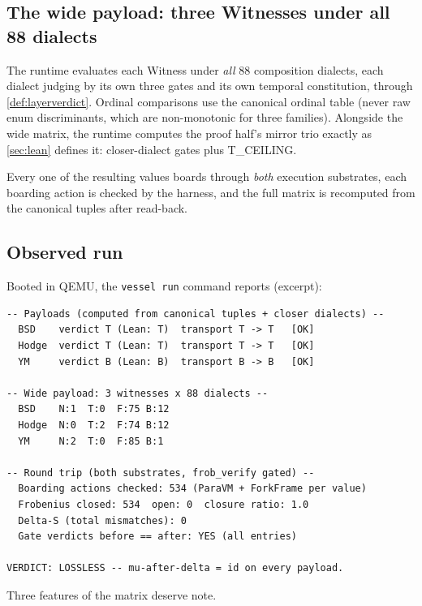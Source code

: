 \documentclass[12pt,a4paper]{article}
\begin{document}
\subsection{The wide payload: three Witnesses under all 88 dialects}

The runtime evaluates each Witness under \emph{all} $88$ composition
dialects, each dialect judging by its own three gates and its own
temporal constitution, through \cref{def:layerverdict}. Ordinal
comparisons use the canonical ordinal table (never raw enum discriminants,
which are non-monotonic for three families). Alongside the wide matrix,
the runtime computes the proof half's mirror trio exactly as
\cref{sec:lean} defines it: closer-dialect gates plus T\_CEILING.

Every one of the resulting values boards through \emph{both} execution
substrates, each boarding action is checked by the harness, and the full
matrix is recomputed from the canonical tuples after read-back.

\subsection{Observed run}

Booted in QEMU, the \texttt{vessel run} command reports (excerpt):

\begin{lstlisting}[caption={QEMU serial output (excerpt).}]
-- Payloads (computed from canonical tuples + closer dialects) --
  BSD    verdict T (Lean: T)  transport T -> T   [OK]
  Hodge  verdict T (Lean: T)  transport T -> T   [OK]
  YM     verdict B (Lean: B)  transport B -> B   [OK]

-- Wide payload: 3 witnesses x 88 dialects --
  BSD    N:1  T:0  F:75 B:12
  Hodge  N:0  T:2  F:74 B:12
  YM     N:2  T:0  F:85 B:1

-- Round trip (both substrates, frob_verify gated) --
  Boarding actions checked: 534 (ParaVM + ForkFrame per value)
  Frobenius closed: 534  open: 0  closure ratio: 1.0
  Delta-S (total mismatches): 0
  Gate verdicts before == after: YES (all entries)

VERDICT: LOSSLESS -- mu-after-delta = id on every payload.
\end{lstlisting}

Three features of the matrix deserve note.
\end{document}
